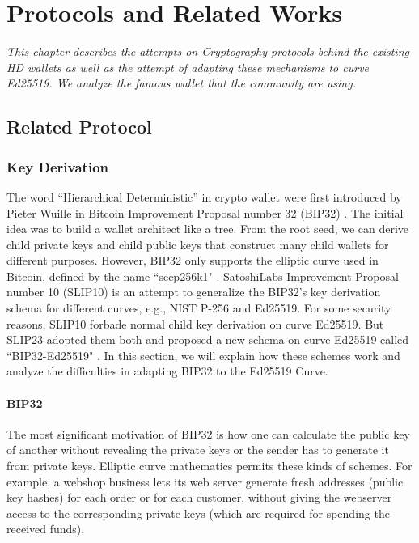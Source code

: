 \chapter{Protocols and Related Works}
\label{chap: Related works}

\textit{This chapter describes the attempts on Cryptography protocols behind the existing HD wallets as
    well as the attempt of adapting these mechanisms to curve Ed25519. We analyze the famous wallet that the community are using.}

\minitoc

\section{Related Protocol}
\subsection{Key Derivation}

The word “Hierarchical Deterministic” in crypto wallet were first introduced by Pieter Wuille in Bitcoin Improvement Proposal number 32 (BIP32) \cite{github/bip0032}. The initial idea was to build a wallet architect like a tree. From the root seed, we can derive child private keys and child public keys that construct many child wallets for different purposes. However, BIP32 only supports the elliptic curve used in Bitcoin, defined by the name ``secp256k1" \cite{secp256k1}. SatoshiLabs Improvement Proposal number 10 (SLIP10) is an attempt to generalize the BIP32's key derivation schema for different curves, e.g., NIST P-256 and Ed25519. For some security reasons, SLIP10 forbade normal child key derivation on curve Ed25519. But SLIP23 adopted them both and proposed a new schema on curve Ed25519 called ``BIP32-Ed25519" \cite{Khovratovich2017}. In this section, we will explain how these schemes work and analyze the difficulties in adapting BIP32 to the Ed25519 Curve.

\subsubsection{BIP32}
\label{bip32}
The most significant motivation of BIP32 is how one can calculate the public key of another without revealing the private keys or the sender has to generate it from private keys. Elliptic curve mathematics permits these kinds of schemes. For example, a webshop business lets its web server generate fresh addresses (public key hashes) for each order or for each customer, without giving the webserver access to the corresponding private keys (which are required for spending the received funds).

